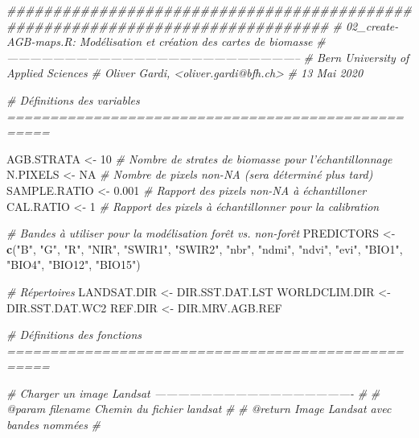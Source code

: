 \documentclass[a4paper, notitlepage, 12pt, krantz2]{krantz}
\newenvironment{Shaded}{\begin{snugshade}}{\end{snugshade}}
\newcommand{\CommentTok}[1]{\textcolor[rgb]{0.56,0.35,0.01}{\textit{#1}}}
\newcommand{\DecValTok}[1]{\textcolor[rgb]{0.00,0.00,0.81}{#1}}
\newcommand{\FloatTok}[1]{\textcolor[rgb]{0.00,0.00,0.81}{#1}}
\newcommand{\KeywordTok}[1]{\textcolor[rgb]{0.13,0.29,0.53}{\textbf{#1}}}
\newcommand{\NormalTok}[1]{#1}
\newcommand{\OtherTok}[1]{\textcolor[rgb]{0.56,0.35,0.01}{#1}}
\newcommand{\StringTok}[1]{\textcolor[rgb]{0.31,0.60,0.02}{#1}}
\begin{document}
\begin{Shaded}
\begin{Highlighting}[]
\CommentTok{###############################################################################}
\CommentTok{# 02_create-AGB-maps.R: Modélisation et création des cartes de biomasse}
\CommentTok{# -----------------------------------------------------------------------------}
\CommentTok{# Bern University of Applied Sciences}
\CommentTok{# Oliver Gardi, <oliver.gardi@bfh.ch>}
\CommentTok{# 13 Mai 2020}

\CommentTok{# Définitions des variables ===================================================}

\NormalTok{AGB.STRATA     <-}\StringTok{ }\DecValTok{10}     \CommentTok{# Nombre de strates de biomasse pour l'échantillonnage}
\NormalTok{N.PIXELS       <-}\StringTok{ }\OtherTok{NA}     \CommentTok{# Nombre de pixels non-NA (sera déterminé plus tard)}
\NormalTok{SAMPLE.RATIO   <-}\StringTok{ }\FloatTok{0.001}  \CommentTok{# Rapport des pixels non-NA à échantilloner}
\NormalTok{CAL.RATIO      <-}\StringTok{ }\DecValTok{1}      \CommentTok{# Rapport des pixels à échantillonner pour la calibration }

\CommentTok{# Bandes à utiliser pour la modélisation forêt vs. non-forêt}
\NormalTok{PREDICTORS  <-}\StringTok{ }\KeywordTok{c}\NormalTok{(}\StringTok{"B"}\NormalTok{, }\StringTok{"G"}\NormalTok{, }\StringTok{"R"}\NormalTok{, }\StringTok{"NIR"}\NormalTok{, }\StringTok{"SWIR1"}\NormalTok{, }\StringTok{"SWIR2"}\NormalTok{,}
                 \StringTok{"nbr"}\NormalTok{, }\StringTok{"ndmi"}\NormalTok{, }\StringTok{"ndvi"}\NormalTok{, }\StringTok{"evi"}\NormalTok{,          }
                 \StringTok{"BIO1"}\NormalTok{, }\StringTok{"BIO4"}\NormalTok{, }\StringTok{"BIO12"}\NormalTok{, }\StringTok{"BIO15"}\NormalTok{) }

\CommentTok{# Répertoires}
\NormalTok{LANDSAT.DIR <-}\StringTok{ }\NormalTok{DIR.SST.DAT.LST}
\NormalTok{WORLDCLIM.DIR <-}\StringTok{ }\NormalTok{DIR.SST.DAT.WC2}
\NormalTok{REF.DIR <-}\StringTok{ }\NormalTok{DIR.MRV.AGB.REF}


\CommentTok{# Définitions des fonctions ===================================================}

\CommentTok{# Charger un image Landsat ----------------------------------------------------}
\CommentTok{#}
\CommentTok{# @param filename  Chemin du fichier landsat}
\CommentTok{#}
\CommentTok{# @return          Image Landsat avec bandes nommées }
\CommentTok{#}


\end{Highlighting}
\end{Shaded}
\end{document}

